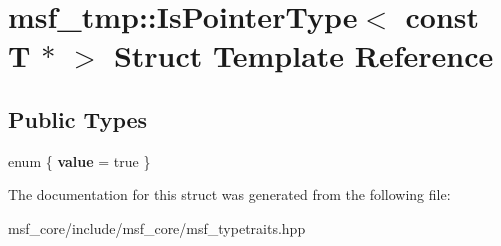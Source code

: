 \hypertarget{structmsf__tmp_1_1IsPointerType_3_01const_01T_01_5_01_4}{\section{msf\-\_\-tmp\-:\-:Is\-Pointer\-Type$<$ const T $\ast$ $>$ Struct Template Reference}
\label{structmsf__tmp_1_1IsPointerType_3_01const_01T_01_5_01_4}
}
\subsection*{Public Types}
\begin{DoxyCompactItemize}
\item 
enum \{ {\bfseries value} =  true
 \}
\end{DoxyCompactItemize}


The documentation for this struct was generated from the following file\-:\begin{DoxyCompactItemize}
\item 
msf\-\_\-core/include/msf\-\_\-core/msf\-\_\-typetraits.\-hpp\end{DoxyCompactItemize}
